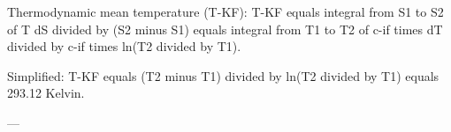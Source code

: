 Thermodynamic mean temperature (T-KF):  
T-KF equals integral from S1 to S2 of T dS divided by (S2 minus S1) equals integral from T1 to T2 of c-if times dT divided by c-if times ln(T2 divided by T1).  

Simplified:  
T-KF equals (T2 minus T1) divided by ln(T2 divided by T1) equals 293.12 Kelvin.  

---